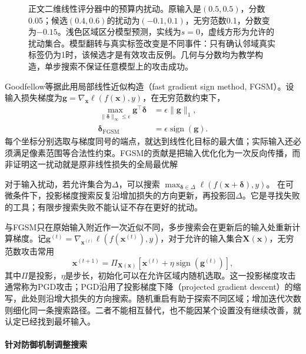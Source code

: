 \begin{figure}[!htb]
  \centering
  
  \caption{正文二维线性评分器中的预算内扰动。原输入是$(0.5,0.5)$，分数0.05；候选$(0.4,0.6)$的扰动为$(-0.1,0.1)$，无穷范数0.1，分数变为$-0.15$。浅色区域区分模型预测，实线为$s=0$，虚线方形为允许的扰动集合。模型翻转与真实标签改变是不同事件：只有确认邻域真实标签仍为1时，该候选才是有效攻击反例。几何与分数均为教学构造，单步搜索不保证任意模型上的攻击成功。}
  \label{fig:trust-adversarial-perturbation}
\end{figure}

Goodfellow等据此用局部线性近似构造（fast gradient sign method, FGSM）。设输入损失梯度为$\bm{g}=\nabla_{\bm{x}}\ell(f(\bm{x}),y)$，在无穷范数约束下，
\begin{equation}
 \begin{aligned}
 \max_{\|\bm{\delta}\|_\infty\leq\epsilon}
 \bm{g}^{\top}\bm{\delta}
 &=\epsilon\|\bm{g}\|_1,\\
 \bm{\delta}_{\mathrm{FGSM}}
 &=\epsilon\operatorname{sign}(\bm{g}).
 \end{aligned}
 \label{eq:security-fgsm}
\end{equation}
每个坐标分别选取与梯度同号的端点，就达到线性化目标的最大值；实际输入还必须满足像素范围等合法性约束。FGSM的贡献是把输入优化化为一次反向传播，而非证明这一扰动就是原非线性损失的全局最优解

对于输入扰动，若允许集合为$\Delta$，可以搜索
$\max_{\bm{\delta}\in\Delta}\ell(f(\bm{x}+\bm{\delta}),y)$。
在可微条件下，投影梯度搜索反复沿增加损失的方向更新，再投影回$\Delta$。它是寻找失败的工具；有限步搜索失败不能认证不存在更好的扰动。

与FGSM只在原始输入附近作一次近似不同，多步搜索会在更新后的输入处重新计算梯度。记$\bm{g}^{(t)}=\nabla_{\bm{x}^{(t)}}\ell(f(\bm{x}^{(t)}),y)$，对于允许的输入集合$\bm X(\bm{x})$，无穷范数攻击常用
\begin{equation}
 \bm{x}^{(t+1)}
 =\Pi_{\bm X(\bm{x})}
 \left[
 \bm{x}^{(t)}
 +\eta\operatorname{sign}(\bm{g}^{(t)})
 \right],
 \label{eq:security-pgd}
\end{equation}
其中$\Pi$是投影，$\eta$是步长，初始化可以在允许区域内随机选取。这一投影梯度攻击通常称为PGD攻击；PGD沿用了投影梯度下降（projected gradient descent）的缩写，此处则沿增大损失的方向搜索。随机重启有助于探索不同区域；增加迭代次数则细化同一条搜索路径。二者不能相互替代，也不能因某个设置没有继续改善，就认定已经找到最坏输入。

\paragraph{针对防御机制调整搜索}

